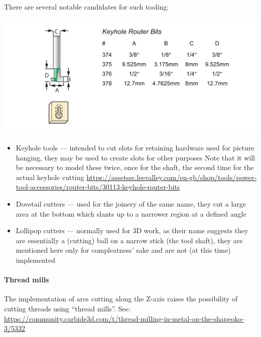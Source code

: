 \documentclass{ltxdoc}
\begin{document}
\begin{samepage}
There are several notable candidates for such tooling:

\noindent\includegraphics[width=\linewidth]{images/keyhole_router_bits.pdf}%

\begin{itemize}
\item Keyhole tools --- intended to cut slots for retaining hardware used for picture
                        hanging, they may be used to create slots for other purposes
                        Note that it will be necessary to model these twice, once for
                        the shaft, the second time for the actual keyhole cutting
                        \url{https://assetssc.leevalley.com/en-gb/shop/tools/power-tool-accessories/router-bits/30113-keyhole-router-bits}
\item Dovetail cutters --- used for the joinery of the same name, they cut a large
                           area at the bottom which slants up to a narrower region
                           at a defined angle
\item Lollipop cutters --- normally used for 3D work, as their name suggests they are
                           essentially a (cutting) ball on a narrow stick (the tool shaft),
                           they are mentioned here only for compleatness' sake and are not
                           (at this time) implemented
\end{itemize}
\end{samepage}

\paragraph{Thread mills}

\label{para:threadmills} The implementation of arcs cutting along the Z-axis raises the 
possibility of cutting threads using ``thread mills''. 
See: \url{https://community.carbide3d.com/t/thread-milling-in-metal-on-the-shapeoko-3/5332}
\end{document}
